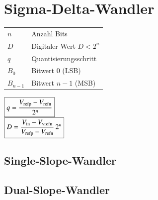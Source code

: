 \section{Sigma-Delta-Wandler}

\begin{minipage}{0.45\linewidth}
    \begin{tabular}{ll}
        $n$ & Anzahl Bits \\
        $D$ & Digitaler Wert \quad $D < 2^n$ \\
        $q$ & Quantisierungsschritt \\
        $B_0$ & Bitwert 0 (LSB) \\
        $B_{n-1}$ & Bitwert $n-1$ (MSB)
    \end{tabular}
\end{minipage}
\hfill
\begin{minipage}{0.42\linewidth}
    $ \boxed{ q = \frac{V_{\rm refp} - V_{\rm refn}}{2^n} } $ \\
    $ \boxed{ D = \frac{V_{\rm in} - V_{\rm vrefn}}{V_{\rm refp} - V_{\rm refn}} \, 2^n }  $
\end{minipage}


\subsection{Single-Slope-Wandler}



\subsection{Dual-Slope-Wandler}


